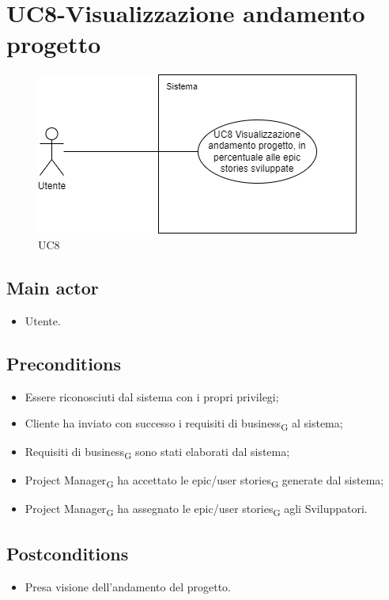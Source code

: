 \documentclass{article}
\begin{document}
\section{UC8-Visualizzazione andamento progetto}
    \begin{figure}[h]
      \centering
      \includegraphics{./imgUML/UC8.png}
        \caption{UC8}
      \label{fig:UC8}
    \end{figure}
    
    \subsection*{Main actor}
        \begin{itemize}
            \item Utente.
        \end{itemize}
        
    \subsection*{Preconditions}
        \begin{itemize}
            \item Essere riconosciuti dal sistema con i propri privilegi;
            \item Cliente ha inviato con successo i requisiti di business\textsubscript{G} al sistema;
            \item Requisiti di business\textsubscript{G} sono stati elaborati dal sistema;
            \item Project Manager\textsubscript{G} ha accettato le epic/user stories\textsubscript{G} generate dal sistema;
            \item Project Manager\textsubscript{G} ha assegnato le epic/user stories\textsubscript{G} agli Sviluppatori.
        \end{itemize}
        
    \subsection*{Postconditions}
        \begin{itemize}
            \item Presa visione dell'andamento del progetto.
        \end{itemize}
        
\end{document}
